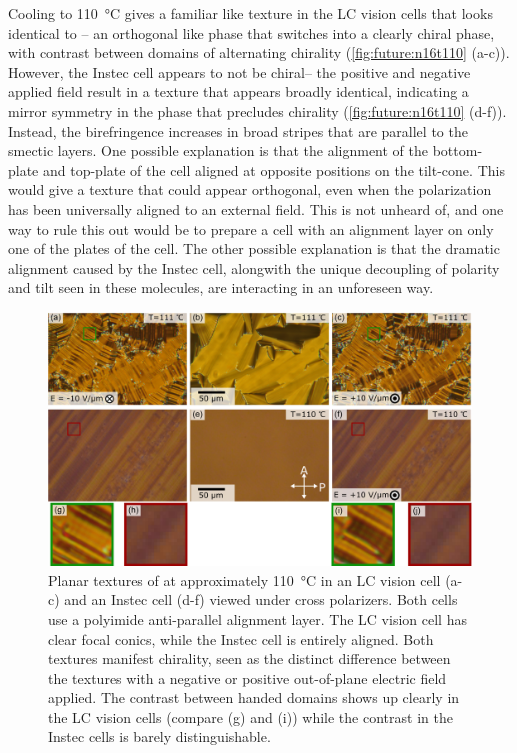 \documentclass[aagreenthesis]{subfiles}
\begin{document}
Cooling to \SI{110}{\degreeCelsius}  gives a familiar \smcapa{} like texture in
the LC vision cells that looks identical to \nfour{}-- an orthogonal like phase
that switches into a clearly chiral phase, with contrast between domains of
alternating chirality (\autoref{fig:future:n16t110} (a-c)). However, the Instec cell appears to not be chiral-- the
positive and negative applied field result in a texture that appears broadly
identical, indicating a mirror symmetry in the phase that precludes
chirality (\autoref{fig:future:n16t110} (d-f)). Instead, the birefringence
increases in broad stripes that are parallel to the smectic layers. One possible
explanation is that the alignment of the bottom-plate and top-plate of the cell
aligned at opposite positions on the tilt-cone. This would give a texture that
could appear orthogonal, even when the polarization has been universally aligned
to an external field. This is not unheard of, and one way to rule this out would
be to prepare a cell with an alignment layer on only one of the plates of the
cell. The other possible explanation is that the dramatic alignment caused by
the Instec cell, alongwith the unique decoupling of polarity and tilt seen in
these molecules, are interacting in an unforeseen way. 

\begin{figure}[h!]
    \centering
    \includegraphics[width=\textwidth]{figs/pal30/future/LCvIn110.png}
    \caption{\label{fig:future:n16t110}  Planar textures of \nsix{} at
        approximately \SI{110}{\degreeCelsius} in an LC vision cell
    (a-c) and an Instec cell (d-f) viewed under cross polarizers. Both cells use a polyimide anti-parallel
alignment layer. The LC vision cell has clear focal conics, while the Instec
cell is entirely aligned. Both textures manifest chirality, seen as the distinct
difference between the textures with a negative or positive out-of-plane
electric field applied. The contrast between handed domains shows up clearly in
the LC vision cells (compare (g) and (i)) while the contrast in the Instec cells
is barely distinguishable. }
\end{figure}
\end{document}
